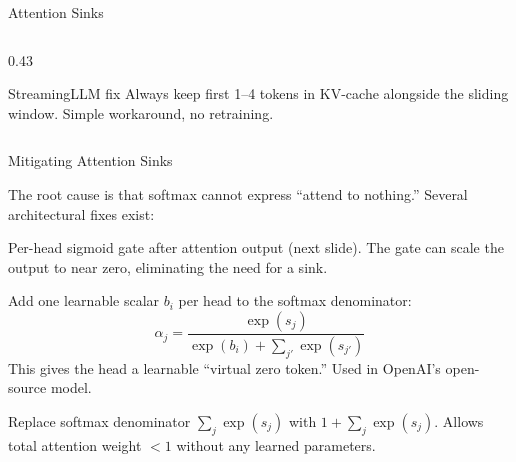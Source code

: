 \begin{frame}{Attention Sinks~\cite{xiao2024streamingllm}}
\begin{columns}[T]
\begin{column}{0.43\textwidth}

      \vspace{0.3em}
      \begin{block}{\small StreamingLLM fix}
        Always keep first 1--4 tokens in KV-cache alongside the sliding window.
        Simple workaround, no retraining.
      \end{block}
    \end{column}
  \end{columns}
\end{frame}

\begin{frame}{Mitigating Attention Sinks}

  The root cause is that softmax cannot express ``attend to nothing.'' Several architectural fixes exist:

  \vspace{0.5em}
  \begin{description}[labelwidth=2.8cm, leftmargin=3.0cm]
    \item[Gated attention] Per-head sigmoid gate after attention output (next slide). The gate can scale the output to near zero, eliminating the need for a sink.
    \item[Learned sink bias] Add one learnable scalar $b_i$ per head to the softmax denominator:
      \[
        \alpha_j = \frac{\exp(s_j)}{\exp(b_i) + \sum_{j'} \exp(s_{j'})}
      \]
      This gives the head a learnable ``virtual zero token.'' Used in OpenAI's open-source model.
    \item[Softmax$_1$] Replace softmax denominator $\sum_j \exp(s_j)$ with $1 + \sum_j \exp(s_j)$.
      Allows total attention weight $< 1$ without any learned parameters.
  \end{description}
\end{frame}

